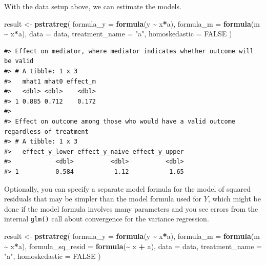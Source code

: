 \documentclass[
]{book}
\newenvironment{Shaded}{\begin{snugshade}}{\end{snugshade}}
\newcommand{\AttributeTok}[1]{\textcolor[rgb]{0.13,0.29,0.53}{#1}}
\newcommand{\ConstantTok}[1]{\textcolor[rgb]{0.56,0.35,0.01}{#1}}
\newcommand{\FunctionTok}[1]{\textcolor[rgb]{0.13,0.29,0.53}{\textbf{#1}}}
\newcommand{\NormalTok}[1]{#1}
\newcommand{\OtherTok}[1]{\textcolor[rgb]{0.56,0.35,0.01}{#1}}
\newcommand{\SpecialCharTok}[1]{\textcolor[rgb]{0.81,0.36,0.00}{\textbf{#1}}}
\newcommand{\StringTok}[1]{\textcolor[rgb]{0.31,0.60,0.02}{#1}}
\begin{document}
With the data setup above, we can estimate the models.

\begin{Shaded}
\begin{Highlighting}[]
\NormalTok{result }\OtherTok{\textless{}{-}} \FunctionTok{pstratreg}\NormalTok{(}
  \AttributeTok{formula\_y =} \FunctionTok{formula}\NormalTok{(y }\SpecialCharTok{\textasciitilde{}}\NormalTok{ x}\SpecialCharTok{*}\NormalTok{a),}
  \AttributeTok{formula\_m =} \FunctionTok{formula}\NormalTok{(m }\SpecialCharTok{\textasciitilde{}}\NormalTok{ x}\SpecialCharTok{*}\NormalTok{a),}
  \AttributeTok{data =}\NormalTok{ data,}
  \AttributeTok{treatment\_name =} \StringTok{"a"}\NormalTok{,}
  \AttributeTok{homoskedastic =} \ConstantTok{FALSE}
\NormalTok{)}
\end{Highlighting}
\end{Shaded}

\begin{verbatim}
#> Effect on mediator, where mediator indicates whether outcome will be valid
#> # A tibble: 1 x 3
#>   mhat1 mhat0 effect_m
#>   <dbl> <dbl>    <dbl>
#> 1 0.885 0.712    0.172
#> 
#> Effect on outcome among those who would have a valid outcome regardless of treatment
#> # A tibble: 1 x 3
#>   effect_y_lower effect_y_naive effect_y_upper
#>            <dbl>          <dbl>          <dbl>
#> 1          0.584           1.12           1.65
\end{verbatim}

Optionally, you can specify a separate model formula for the model of squared residuals that may be simpler than the model formula used for \(Y\), which might be done if the model formula involves many parameters and you see errors from the internal \texttt{glm()} call about convergence for the variance regression.

\begin{Shaded}
\begin{Highlighting}[]
\NormalTok{result }\OtherTok{\textless{}{-}} \FunctionTok{pstratreg}\NormalTok{(}
  \AttributeTok{formula\_y =} \FunctionTok{formula}\NormalTok{(y }\SpecialCharTok{\textasciitilde{}}\NormalTok{ x}\SpecialCharTok{*}\NormalTok{a),}
  \AttributeTok{formula\_m =} \FunctionTok{formula}\NormalTok{(m }\SpecialCharTok{\textasciitilde{}}\NormalTok{ x}\SpecialCharTok{*}\NormalTok{a),}
  \AttributeTok{formula\_sq\_resid =} \FunctionTok{formula}\NormalTok{(}\SpecialCharTok{\textasciitilde{}}\NormalTok{ x }\SpecialCharTok{+}\NormalTok{ a),}
  \AttributeTok{data =}\NormalTok{ data,}
  \AttributeTok{treatment\_name =} \StringTok{"a"}\NormalTok{,}
  \AttributeTok{homoskedastic =} \ConstantTok{FALSE}
\NormalTok{)}
\end{Highlighting}
\end{Shaded}
\end{document}
